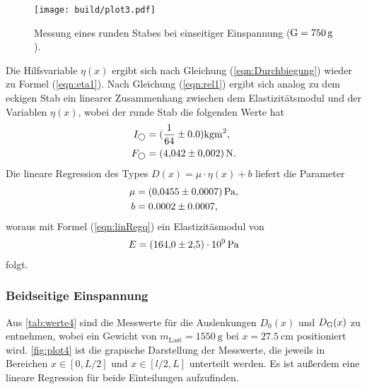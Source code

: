 \sloppy
\begin{figure}[H]
  \centering
  \texttt{[image: build/plot3.pdf]}
  \caption{Messung eines runden Stabes bei einseitiger Einspannung ($\text G = \SI{750}{\gram}$).}
  \label{fig:plot3}
\end{figure}

\sloppy
Die Hilfsvariable $\eta(x)$ ergibt sich nach Gleichung (\ref{eqn:Durchbiegung}) wieder zu Formel (\ref{eqn:eta1}).
Nach Gleichung (\ref{eqn:rel1}) ergibt sich analog zu dem eckigen Stab ein linearer Zusammenhang zwischen dem Elastizitätsmodul und
der Variablen $\eta(x)$, wobei der runde Stab die folgenden Werte hat
\begin{align*}
  I_{\bigcirc} &= (\frac{1}{64} \pm 0.0) \si{\kilo\gram\meter^2}, \\
  F_{\bigcirc} &= \SI{4.042 (0.002)}{\newton}. \\
\end{align*}
Die lineare Regression des Types $D(x) = \mu\cdot\eta(x)+b$ liefert die Parameter
\begin{align*}
  \mu &= \SI{0.0455 (0.0007)}{\Pa},\\
  b &= 0.0002 \pm 0.0007, \\
\end{align*}
woraus mit Formel (\ref{eqn:linRegq}) ein Elastizitäsmodul von
\begin{align*}
  E = \SI{164 (2.5)e9}{\Pa}
\end{align*}
folgt.


\subsubsection{Beidseitige Einspannung}
\label{subsubsec:rundBeidEins}
Aus \autoref{tab:werte4} sind die Messwerte für die Auslenkungen $D_0(x)$ und $D_{\text G}(x)$ zu entnehmen, wobei ein Gewicht von
$m_{\text{Last}}=\SI{1550}{\gram}$ bei $x=\SI{27.5}{\cm}$ positioniert wird. \autoref{fig:plot4} ist die grapische Darstellung der Messwerte, die 
jeweils in Bereichen $x \in [0, L/2] $ und 
$x \in [l/2,L]$ unterteilt werden. Es ist außerdem eine lineare Regression für beide Einteilungen
aufzufinden.

